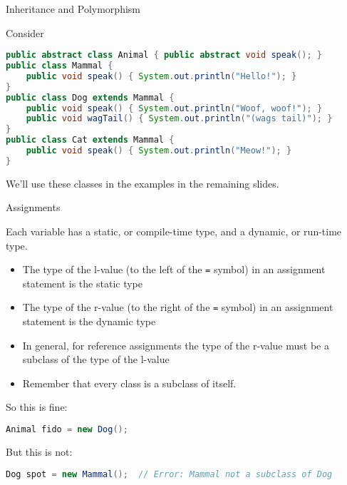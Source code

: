 \documentclass{beamer}
\begin{document}
\begin{frame}[fragile]{Inheritance and Polymorphism}


Consider
\begin{lstlisting}[language=Java]
public abstract class Animal { public abstract void speak(); }
public class Mammal {
    public void speak() { System.out.println("Hello!"); }
}
public class Dog extends Mammal {
    public void speak() { System.out.println("Woof, woof!"); }
    public void wagTail() { System.out.println("(wags tail)"); }        
}
public class Cat extends Mammal {
    public void speak() { System.out.println("Meow!"); }  
}
\end{lstlisting}

We'll use these classes in the examples in the remaining slides.

\end{frame}

\begin{frame}[fragile]{Assignments}


Each variable has a static, or compile-time type, and a dynamic, or run-time type.
\begin{itemize}
\item The type of the l-value (to the left of the {\tt =} symbol) in an assignment statement is the static type
\item The type of the r-value (to the right of the {\tt =} symbol) in an assignment statement is the dynamic type
\item In general, for reference assignments the type of the r-value must be a subclass of the type of the l-value
\item Remember that every class is a subclass of itself.
\end{itemize}

So this is fine:
\begin{lstlisting}[language=Java]
Animal fido = new Dog();
\end{lstlisting}
But this is not:
\begin{lstlisting}[language=Java]
Dog spot = new Mammal();  // Error: Mammal not a subclass of Dog
\end{lstlisting}


\end{frame}
\end{document}
